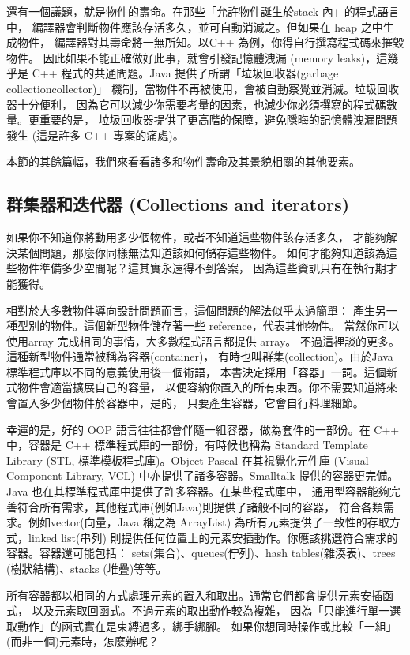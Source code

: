 還有一個議題，就是物件的壽命。在那些「允許物件誕生於stack 內」的程式語言中，
編譯器會判斷物件應該存活多久，並可自動消滅之。但如果在 heap 之中生成物件，
編譯器對其壽命將一無所知。以C++ 為例，你得自行撰寫程式碼來摧毀物件。
因此如果不能正確做好此事，就會引發記憶體洩漏 (memory leaks)，這幾乎是
C++ 程式的共通問題。Java 提供了所謂「垃圾回收器(garbage collectioncollector)」
機制，當物件不再被使用，會被自動察覺並消滅。垃圾回收器十分便利，
因為它可以減少你需要考量的因素，也減少你必須撰寫的程式碼數量。更重要的是，
垃圾回收器提供了更高階的保障，避免隱晦的記憶體洩漏問題發生
(這是許多 C++ 專案的痛處)。

本節的其餘篇幅，我們來看看諸多和物件壽命及其景貌相關的其他要素。


\subsection{群集器和迭代器 (Collections and iterators)}
如果你不知道你將動用多少個物件，或者不知道這些物件該存活多久，
才能夠解決某個問題，那麼你同樣無法知道該如何儲存這些物件。
如何才能夠知道該為這些物件準備多少空間呢？這其實永遠得不到答案，
因為這些資訊只有在執行期才能獲得。

相對於大多數物件導向設計問題而言，這個問題的解法似乎太過簡單：
產生另一種型別的物件。這個新型物件儲存著一些 reference，代表其他物件。
當然你可以使用array 完成相同的事情，大多數程式語言都提供 array。
不過這裡談的更多。這種新型物件通常被稱為容器(container)，
有時也叫群集(collection)。由於Java 標準程式庫以不同的意義使用後一個術語，
本書決定採用「容器」一詞。這個新式物件會適當擴展自己的容量，
以便容納你置入的所有東西。你不需要知道將來會置入多少個物件於容器中，是的，
只要產生容器，它會自行料理細節。

幸運的是，好的 OOP 語言往往都會伴隨一組容器，做為套件的一部份。在 C++ 中，容器是
C++ 標準程式庫的一部份，有時候也稱為 Standard Template Library
(STL, 標準模板程式庫)。Object Pascal 在其視覺化元件庫
(Visual Component Library, VCL) 中亦提供了諸多容器。Smalltalk 提供的容器更完備。
Java 也在其標準程式庫中提供了許多容器。在某些程式庫中，
通用型容器能夠完善符合所有需求，其他程式庫(例如Java)則提供了諸般不同的容器，
符合各類需求。例如vector(向量，Java 稱之為 ArrayList)
為所有元素提供了一致性的存取方式，linked list(串列)
則提供任何位置上的元素安插動作。你應該挑選符合需求的容器。容器還可能包括：
sets(集合)、queues(佇列)、hash tables(雜湊表)、trees (樹狀結構)、stacks
(堆疊)等等。

所有容器都以相同的方式處理元素的置入和取出。通常它們都會提供元素安插函式，
以及元素取回函式。不過元素的取出動作較為複雜，
因為「只能進行單一選取動作」的函式實在是束縛過多，綁手綁腳。
如果你想同時操作或比較「一組」(而非一個)元素時，怎麼辦呢？

